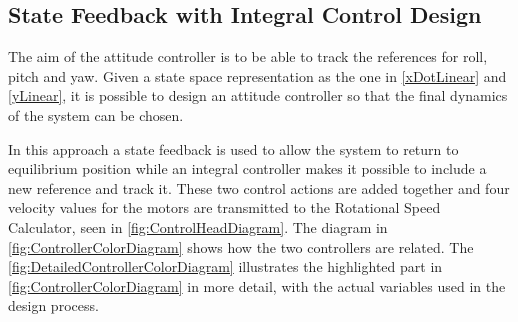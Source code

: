 \subsection{State Feedback with Integral Control Design}
The aim of the attitude controller is to be able to track the references for roll, pitch and yaw. Given a state space representation as the one in \autoref{xDotLinear} and \ref{yLinear}, it is possible to design an attitude controller so that the final dynamics of the system can be chosen.

In this approach a state feedback is used to allow the system to return to equilibrium position while an integral controller makes it possible to include a new reference and track it. These two control actions are added together and four velocity values for the motors are transmitted to the Rotational Speed Calculator, seen in \autoref{fig:ControlHeadDiagram}. The diagram in \autoref{fig:ControllerColorDiagram} shows how the two controllers are related. The \autoref{fig:DetailedControllerColorDiagram} illustrates the highlighted part in \autoref{fig:ControllerColorDiagram} in more detail, with the actual variables used in the design process.
%
